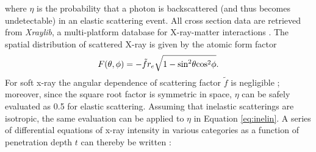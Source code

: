 \documentclass[]{article}
\begin{document}
where $\eta$ is the probability that a photon is backscattered (and thus becomes undetectable) in an elastic scattering event. All cross section data are retrieved from \textit{Xraylib}, a multi-platform database for X-ray-matter interactions \cite{Schoonjans:2011km}. The spatial distribution of scattered X-ray is given by the atomic form factor
\begin{equation}
F(\theta, \phi) = -\tilde{f}r_e\sqrt{1-\textup{sin}^2\theta \textup{cos}^2\phi}.
\end{equation}
For soft x-ray the angular dependence of scattering factor $\tilde{f}$ is negligible \cite{Lonsdale:1962gz}; moreover, since the square root factor is symmetric in space, $\eta$ can be safely evaluated as 0.5 for elastic scattering. Assuming that inelastic scatterings are isotropic, the same evaluation can be applied to $\eta$ in Equation \ref{eq:inelin}. A series of differential equations of x-ray intensity in various categories as a function of penetration depth $t$ can thereby be written \cite{Jacobsen:1998vj}:
\end{document}

